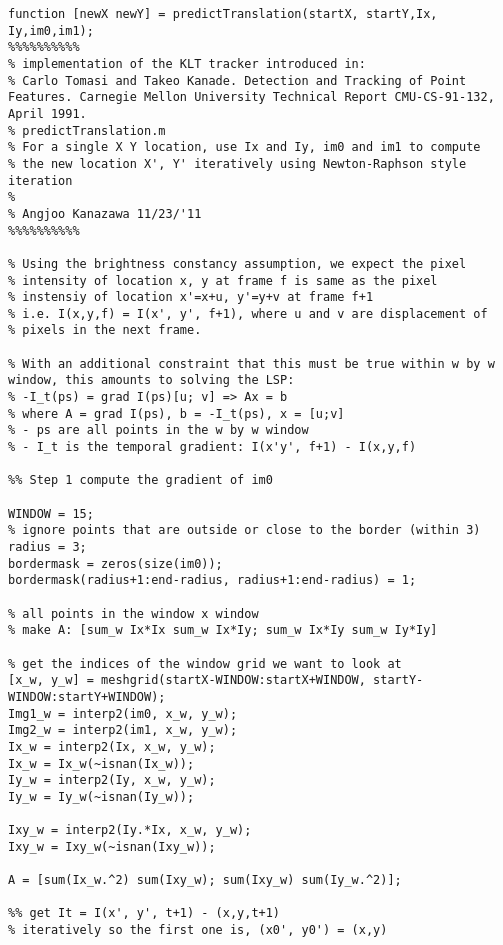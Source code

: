 \begin{verbatim}
function [newX newY] = predictTranslation(startX, startY,Ix, Iy,im0,im1);
%%%%%%%%%%
% implementation of the KLT tracker introduced in: 
% Carlo Tomasi and Takeo Kanade. Detection and Tracking of Point Features. Carnegie Mellon University Technical Report CMU-CS-91-132, April 1991.
% predictTranslation.m
% For a single X Y location, use Ix and Iy, im0 and im1 to compute
% the new location X', Y' iteratively using Newton-Raphson style iteration
%
% Angjoo Kanazawa 11/23/'11
%%%%%%%%%%

% Using the brightness constancy assumption, we expect the pixel
% intensity of location x, y at frame f is same as the pixel
% instensiy of location x'=x+u, y'=y+v at frame f+1
% i.e. I(x,y,f) = I(x', y', f+1), where u and v are displacement of
% pixels in the next frame.

% With an additional constraint that this must be true within w by w window, this amounts to solving the LSP:
% -I_t(ps) = grad I(ps)[u; v] => Ax = b
% where A = grad I(ps), b = -I_t(ps), x = [u;v]
% - ps are all points in the w by w window
% - I_t is the temporal gradient: I(x'y', f+1) - I(x,y,f)

%% Step 1 compute the gradient of im0 

WINDOW = 15; 
% ignore points that are outside or close to the border (within 3)
radius = 3;
bordermask = zeros(size(im0));
bordermask(radius+1:end-radius, radius+1:end-radius) = 1;

% all points in the window x window 
% make A: [sum_w Ix*Ix sum_w Ix*Iy; sum_w Ix*Iy sum_w Iy*Iy]

% get the indices of the window grid we want to look at
[x_w, y_w] = meshgrid(startX-WINDOW:startX+WINDOW, startY-WINDOW:startY+WINDOW);
Img1_w = interp2(im0, x_w, y_w);    
Img2_w = interp2(im1, x_w, y_w);    
Ix_w = interp2(Ix, x_w, y_w);
Ix_w = Ix_w(~isnan(Ix_w));
Iy_w = interp2(Iy, x_w, y_w);
Iy_w = Iy_w(~isnan(Iy_w));

Ixy_w = interp2(Iy.*Ix, x_w, y_w);
Ixy_w = Ixy_w(~isnan(Ixy_w));

A = [sum(Ix_w.^2) sum(Ixy_w); sum(Ixy_w) sum(Iy_w.^2)];

%% get It = I(x', y', t+1) - (x,y,t+1)
% iteratively so the first one is, (x0', y0') = (x,y)


\end{verbatim}
